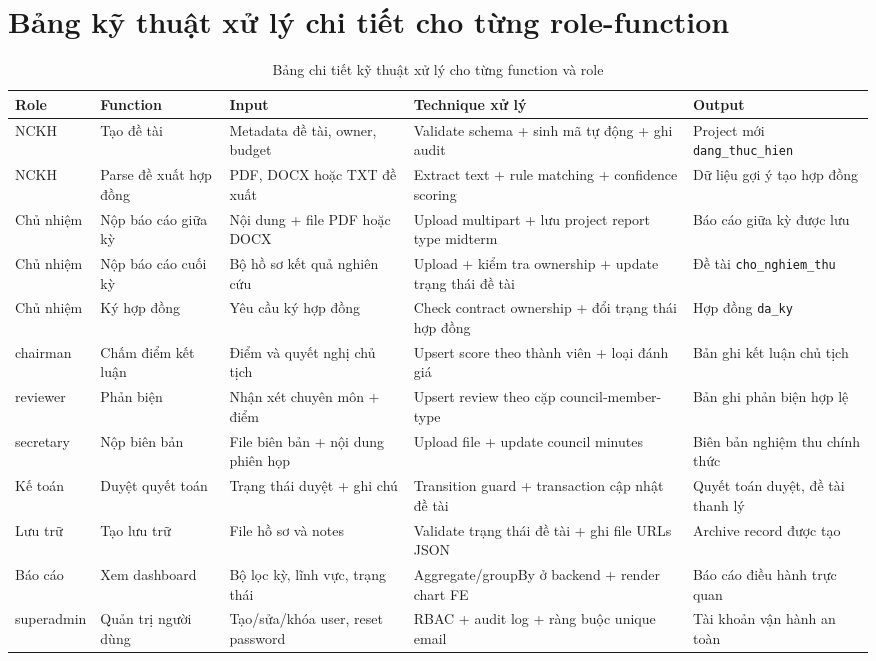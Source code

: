 \documentclass[12pt,a4paper]{report}
\begin{document}
\section{Bảng kỹ thuật xử lý chi tiết cho từng role-function}
\begin{table}[H]
\centering
\scriptsize
\begin{tabular}{|L{2.0cm}|L{2.2cm}|L{3.3cm}|L{3.3cm}|L{2.5cm}|}
\hline
\textbf{Role} & \textbf{Function} & \textbf{Input} & \textbf{Technique xử lý} & \textbf{Output} \\ \hline
NCKH & Tạo đề tài & Metadata đề tài, owner, budget & Validate schema + sinh mã tự động + ghi audit & Project mới \texttt{dang\_thuc\_hien} \\ \hline
NCKH & Parse đề xuất hợp đồng & PDF, DOCX hoặc TXT đề xuất & Extract text + rule matching + confidence scoring & Dữ liệu gợi ý tạo hợp đồng \\ \hline
Chủ nhiệm & Nộp báo cáo giữa kỳ & Nội dung + file PDF hoặc DOCX & Upload multipart + lưu project report type midterm & Báo cáo giữa kỳ được lưu \\ \hline
Chủ nhiệm & Nộp báo cáo cuối kỳ & Bộ hồ sơ kết quả nghiên cứu & Upload + kiểm tra ownership + update trạng thái đề tài & Đề tài \texttt{cho\_nghiem\_thu} \\ \hline
Chủ nhiệm & Ký hợp đồng & Yêu cầu ký hợp đồng & Check contract ownership + đổi trạng thái hợp đồng & Hợp đồng \texttt{da\_ky} \\ \hline
chairman & Chấm điểm kết luận & Điểm và quyết nghị chủ tịch & Upsert score theo thành viên + loại đánh giá & Bản ghi kết luận chủ tịch \\ \hline
reviewer & Phản biện & Nhận xét chuyên môn + điểm & Upsert review theo cặp council-member-type & Bản ghi phản biện hợp lệ \\ \hline
secretary & Nộp biên bản & File biên bản + nội dung phiên họp & Upload file + update council minutes & Biên bản nghiệm thu chính thức \\ \hline
Kế toán & Duyệt quyết toán & Trạng thái duyệt + ghi chú & Transition guard + transaction cập nhật đề tài & Quyết toán duyệt, đề tài thanh lý \\ \hline
Lưu trữ & Tạo lưu trữ & File hồ sơ và notes & Validate trạng thái đề tài + ghi file URLs JSON & Archive record được tạo \\ \hline
Báo cáo & Xem dashboard & Bộ lọc kỳ, lĩnh vực, trạng thái & Aggregate/groupBy ở backend + render chart FE & Báo cáo điều hành trực quan \\ \hline
superadmin & Quản trị người dùng & Tạo/sửa/khóa user, reset password & RBAC + audit log + ràng buộc unique email & Tài khoản vận hành an toàn \\ \hline
\end{tabular}
\caption{Bảng chi tiết kỹ thuật xử lý cho từng function và role}
\end{table}
\end{document}
